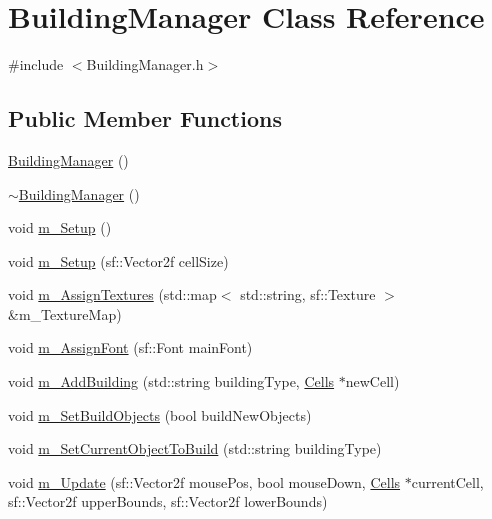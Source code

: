 \hypertarget{class_building_manager}{}\section{Building\+Manager Class Reference}
\label{class_building_manager}


{\ttfamily \#include $<$Building\+Manager.\+h$>$}

\subsection*{Public Member Functions}
\begin{DoxyCompactItemize}
\item 
\mbox{\hyperlink{class_building_manager_ae393b30d59cd8c3f745ea9189f81cd44}{Building\+Manager}} ()
\item 
\mbox{\hyperlink{class_building_manager_ae1018d56c81a769f15705b2f1b4da592}{$\sim$\+Building\+Manager}} ()
\item 
void \mbox{\hyperlink{class_building_manager_af7e1e2b4d3dc88c2254d0a040d599b16}{m\+\_\+\+Setup}} ()
\item 
void \mbox{\hyperlink{class_building_manager_a53af18d219085b44a5f4267b7b55d2ea}{m\+\_\+\+Setup}} (sf\+::\+Vector2f cell\+Size)
\item 
void \mbox{\hyperlink{class_building_manager_a2e4a522b0283fb59a70d60deff94fd30}{m\+\_\+\+Assign\+Textures}} (std\+::map$<$ std\+::string, sf\+::\+Texture $>$ \&m\+\_\+\+Texture\+Map)
\item 
void \mbox{\hyperlink{class_building_manager_ad73beb2ede5b80fdda85daf6b88507b8}{m\+\_\+\+Assign\+Font}} (sf\+::\+Font main\+Font)
\item 
void \mbox{\hyperlink{class_building_manager_a50acd47e63a6dad5930f95673d827749}{m\+\_\+\+Add\+Building}} (std\+::string building\+Type, \mbox{\hyperlink{class_cells}{Cells}} $\ast$new\+Cell)
\item 
void \mbox{\hyperlink{class_building_manager_ac2ca2ad7f60e02b9b2fef3a83c867632}{m\+\_\+\+Set\+Build\+Objects}} (bool build\+New\+Objects)
\item 
void \mbox{\hyperlink{class_building_manager_a59bd90c60e591874c242661517d4e9fe}{m\+\_\+\+Set\+Current\+Object\+To\+Build}} (std\+::string building\+Type)
\item 
void \mbox{\hyperlink{class_building_manager_abedabfdf29d8bef3d49014ac4a37352e}{m\+\_\+\+Update}} (sf\+::\+Vector2f mouse\+Pos, bool mouse\+Down, \mbox{\hyperlink{class_cells}{Cells}} $\ast$current\+Cell, sf\+::\+Vector2f upper\+Bounds, sf\+::\+Vector2f lower\+Bounds)

\end{DoxyCompactItemize}
